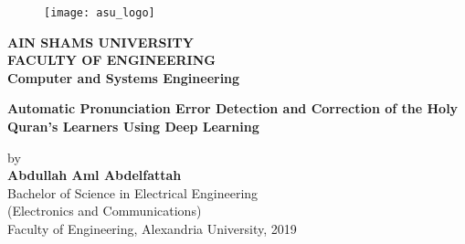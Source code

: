 \cleardoublepage
\newpage
\thispagestyle{empty}
\newlength{\thenamewidth}
\newlength{\thesignaturewidth}
\newlength{\nameskip}

\setlength{\thenamewidth}{8cm}
\setlength{\thesignaturewidth}{4cm}
\setlength{\nameskip}{0.8cm}


 \begin{center}
\begin{figure}
  \begin{center}
    \texttt{[image: asu\_logo]}
  \end{center}
\end{figure}
\small


\textbf{AIN SHAMS UNIVERSITY\\
	FACULTY OF ENGINEERING\\
	Computer and Systems Engineering}



\vfill
\Large
\textbf{Automatic Pronunciation Error Detection and Correction of the Holy Quran's Learners Using Deep Learning} \\ 

\vfill
\small

by\\
\large
\textbf{Abdullah Aml Abdelfattah}\\
\small
Bachelor of Science in Electrical Engineering  \\
(Electronics and Communications)\\
Faculty of Engineering, Alexandria University, 2019\\






\end{center}
